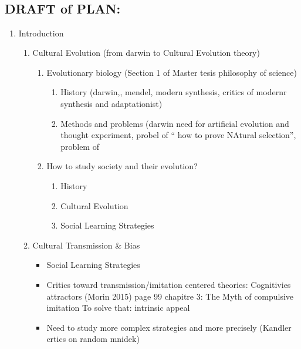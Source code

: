 \documentclass[a4paper]{article}
\begin{document}
\subsection*{\\ DRAFT of PLAN:}
\begin{enumerate}
    \item Introduction
        \begin{enumerate}
            \item Cultural Evolution (from darwin to Cultural Evolution theory)
                \begin{enumerate}
                    \item Evolutionary biology (Section 1 of Master tesis philosophy of science)
                        \begin{enumerate}
                            \item History (darwin,, mendel, modern synthesis, critics of modernr synthesis and adaptationist)
                            \item Methods and problems (darwin need for artificial evolution and thought experiment, probel of `` how to prove NAtural selection'', problem of 
                        \end{enumerate}
                    \item How to study society and their evolution?
                        \begin{enumerate}
                            \item History
                            \item Cultural Evolution
                            \item Social Learning Strategies 
                        \end{enumerate}
                \end{enumerate}
            \item Cultural Transmission \& Bias
                \begin{itemize}
                    \item Social Learning Strategies
                    \item Critics toward transmission/imitation centered theories: Cognitivies attractors (Morin 2015) page 99 chapitre 3: The Myth of compulsive imitation
                        To solve that: intrinsic appeal
                    \item Need to study more complex strategies and more precisely (Kandler crtics on random mnidek)
                \end{itemize}

\end{enumerate}
\end{enumerate}
\end{document}

